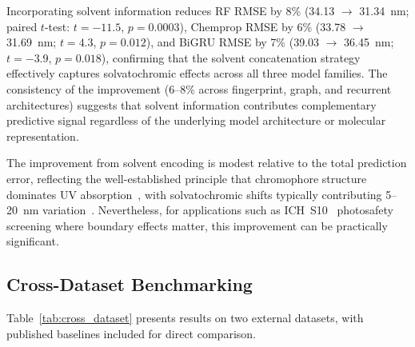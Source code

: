 \documentclass[journal=jcisd8,manuscript=article]{achemso}
\begin{document}
Incorporating solvent information reduces RF RMSE by 8\% (34.13 $\to$ 31.34~nm; paired $t$-test: $t = -11.5$, $p = 0.0003$), Chemprop RMSE by 6\% (33.78 $\to$ 31.69~nm; $t = 4.3$, $p = 0.012$), and BiGRU RMSE by 7\% (39.03 $\to$ 36.45~nm; $t = -3.9$, $p = 0.018$), confirming that the solvent concatenation strategy effectively captures solvatochromic effects across all three model families.
The consistency of the improvement (6--8\% across fingerprint, graph, and recurrent architectures) suggests that solvent information contributes complementary predictive signal regardless of the underlying model architecture or molecular representation.

The improvement from solvent encoding is modest relative to the total prediction error, reflecting the well-established principle that chromophore structure dominates UV absorption~\cite{flemingMolecular2010}, with solvatochromic shifts typically contributing 5--20~nm variation~\cite{reichardt2011solvents}.
Nevertheless, for applications such as ICH~S10~\cite{ICH2013S10} photosafety screening where boundary effects matter, this improvement can be practically significant.


\subsection{Cross-Dataset Benchmarking}
\label{sec:cross_dataset}

Table~\ref{tab:cross_dataset} presents results on two external datasets, with published baselines included for direct comparison.
\end{document}
